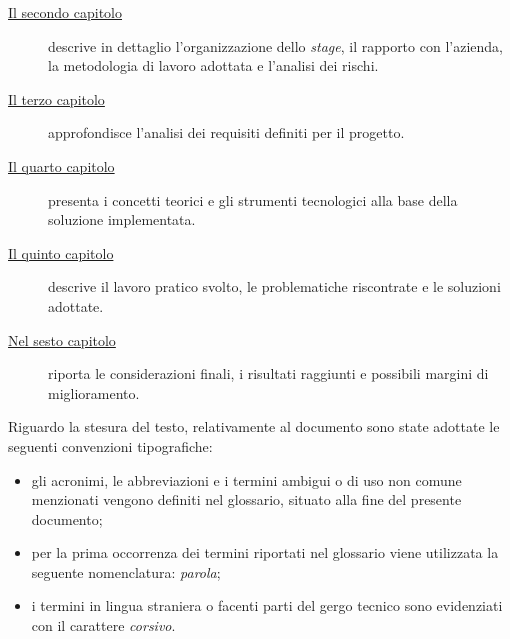 \begin{description}
    \item[{\hyperref[cap:descrizione-stage]{Il secondo capitolo}}] descrive in dettaglio l'organizzazione dello \emph{stage}, il rapporto con l'azienda, la metodologia di lavoro adottata e l'analisi dei rischi.
    
    \item[{\hyperref[cap:analisi-requisiti]{Il terzo capitolo}}] approfondisce l'analisi dei requisiti definiti per il progetto.
    
    \item[{\hyperref[cap:introduzione-teorica]{Il quarto capitolo}}] presenta i concetti teorici e gli strumenti tecnologici alla base della soluzione implementata.
    
    \item[{\hyperref[cap:implementazione-risultati]{Il quinto capitolo}}] descrive il lavoro pratico svolto, le problematiche riscontrate e le soluzioni adottate.
        
    \item[{\hyperref[cap:conclusioni]{Nel sesto capitolo}}] riporta le considerazioni finali, i risultati raggiunti e possibili margini di miglioramento.
\end{description}

Riguardo la stesura del testo, relativamente al documento sono state adottate le seguenti convenzioni tipografiche:
\begin{itemize}
	\item gli acronimi, le abbreviazioni e i termini ambigui o di uso non comune menzionati vengono definiti nel glossario, situato alla fine del presente documento;
	\item per la prima occorrenza dei termini riportati nel glossario viene utilizzata la seguente nomenclatura: \emph{parola}\glsfirstoccur;
	\item i termini in lingua straniera o facenti parti del gergo tecnico sono evidenziati con il carattere \emph{corsivo}.
\end{itemize}